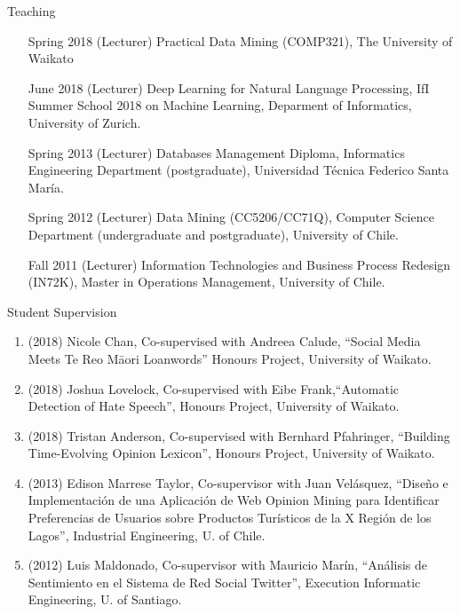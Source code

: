\documentclass[handout]{beamer}
\begin{document}
\begin{frame}{Teaching}
\begin{scriptsize}
  \begin{enumerate}
\item [Spring 2018] (Lecturer) Practical Data Mining (COMP321), The University of Waikato

\item [June 2018] (Lecturer) Deep Learning for Natural Language Processing, IfI Summer School 2018 on Machine Learning,  Deparment of Informatics, University of Zurich. 

\item[Spring 2013] (Lecturer) Databases Management Diploma, Informatics Engineering Department (postgraduate), Universidad Técnica Federico Santa María.

\item[Spring 2012] (Lecturer) Data Mining (CC5206/CC71Q), Computer Science Department (undergraduate and postgraduate), University of Chile.

\item[Fall 2011]   (Lecturer) Information Technologies and Business Process Redesign (IN72K), Master in Operations Management, University of Chile.
  \end{enumerate} 
\end{scriptsize}

\end{frame}




\begin{frame}{Student Supervision}
\begin{scriptsize}
  \begin{enumerate}
\item (2018) Nicole Chan, Co-supervised with Andreea Calude, ``Social Media Meets Te Reo Māori Loanwords''  Honours Project, University of Waikato. 
\item  (2018)  Joshua Lovelock, Co-supervised with Eibe Frank,``Automatic Detection of Hate Speech'', Honours Project, University of Waikato.
\item  (2018) Tristan Anderson, Co-supervised with Bernhard Pfahringer, ``Building Time-Evolving Opinion Lexicon'', Honours Project, University of Waikato.
\item (2013) Edison Marrese Taylor, Co-supervisor with Juan Velásquez, ``Diseño e Implementación de una Aplicación de Web Opinion Mining para Identificar Preferencias de Usuarios sobre Productos Turísticos de la X Región de los Lagos'', Industrial Engineering, U. of Chile.
\item (2012) Luis Maldonado, Co-supervisor with Mauricio Marín, ``Análisis de Sentimiento en el Sistema de Red Social Twitter'', Execution Informatic Engineering, U. of Santiago.
  \end{enumerate} 
\end{scriptsize}

\end{frame}
\end{document}
